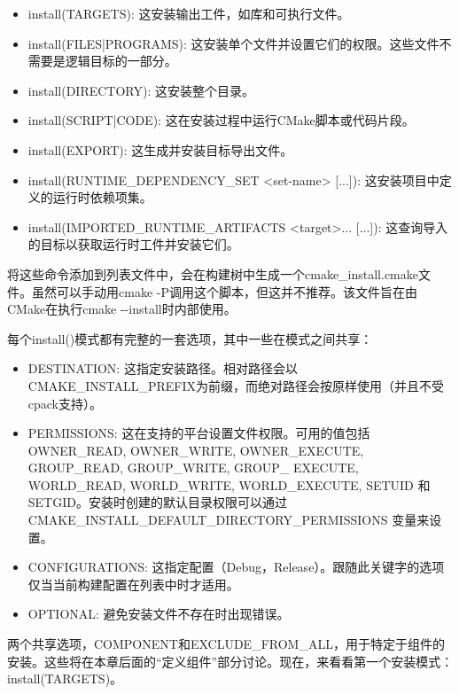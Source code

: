 \begin{itemize}
\item
install(TARGETS): 这安装输出工件，如库和可执行文件。

\item
install(FILES|PROGRAMS): 这安装单个文件并设置它们的权限。这些文件不需要是逻辑目标的一部分。

\item
install(DIRECTORY): 这安装整个目录。

\item
install(SCRIPT|CODE): 这在安装过程中运行CMake脚本或代码片段。

\item
install(EXPORT): 这生成并安装目标导出文件。

\item
install(RUNTIME\_DEPENDENCY\_SET <set-name> [...]): 这安装项目中定义的运行时依赖项集。

\item
install(IMPORTED\_RUNTIME\_ARTIFACTS <target>... [...]): 这查询导入的目标以获取运行时工件并安装它们。
\end{itemize}

将这些命令添加到列表文件中，会在构建树中生成一个cmake\_install.cmake文件。虽然可以手动用cmake -P调用这个脚本，但这并不推荐。该文件旨在由CMake在执行cmake -{}-install时内部使用。

每个install()模式都有完整的一套选项，其中一些在模式之间共享：

\begin{itemize}
\item
DESTINATION: 这指定安装路径。相对路径会以CMAKE\_INSTALL\_PREFIX为前缀，而绝对路径会按原样使用（并且不受cpack支持）。

\item
PERMISSIONS: 这在支持的平台设置文件权限。可用的值包括OWNER\_READ, OWNER\_WRITE, OWNER\_EXECUTE, GROUP\_READ, GROUP\_WRITE, GROUP\_ EXECUTE, WORLD\_READ, WORLD\_WRITE, WORLD\_EXECUTE, SETUID 和 SETGID。安装时创建的默认目录权限可以通过 CMAKE\_INSTALL\_DEFAULT\_DIRECTORY\_PERMISSIONS 变量来设置。

\item
CONFIGURATIONS: 这指定配置（Debug，Release）。跟随此关键字的选项仅当当前构建配置在列表中时才适用。

\item
OPTIONAL: 避免安装文件不存在时出现错误。
\end{itemize}

两个共享选项，COMPONENT和EXCLUDE\_FROM\_ALL，用于特定于组件的安装。这些将在本章后面的“定义组件”部分讨论。现在，来看看第一个安装模式：install(TARGETS)。

